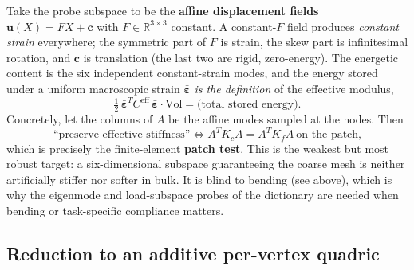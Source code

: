 Take the probe subspace to be the \textbf{affine displacement fields} $\mathbf{u}(X) = FX + \mathbf{c}$ with $F\in\mathbb{R}^{3\times3}$ constant.
A constant-$F$ field produces \emph{constant strain} everywhere; the symmetric part of $F$ is strain, the skew part is infinitesimal rotation, and $\mathbf{c}$ is translation (the last two are rigid, zero-energy).
The energetic content is the six independent constant-strain modes, and the energy stored under a uniform macroscopic strain $\bar{\boldsymbol\varepsilon}$ \emph{is the definition} of the effective modulus,
\begin{equation}
  \tfrac12\,\bar{\boldsymbol\varepsilon}^T C^{\text{eff}}\,\bar{\boldsymbol\varepsilon}
    \cdot \mathrm{Vol} = \text{(total stored energy)}.
\end{equation}
Concretely, let the columns of $A$ be the affine modes sampled at the nodes.
Then
\begin{equation}
  \text{``preserve effective stiffness''}
  \Longleftrightarrow
  A^T K_c A = A^T K_f A \ \text{on the patch,}
\end{equation}
which is precisely the finite-element \textbf{patch test}.
This is the weakest but most robust target: a six-dimensional subspace guaranteeing the coarse mesh is neither artificially stiffer nor softer in bulk.
It is blind to bending (see above), which is why the eigenmode and load-subspace probes of the dictionary are needed when bending or task-specific compliance matters.

\subsection{Reduction to an additive per-vertex quadric}

